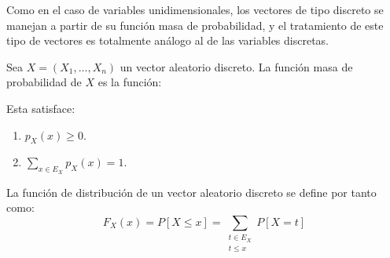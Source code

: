 Como en el caso de variables unidimensionales, los vectores de tipo discreto se manejan a partir de su función masa de probabilidad, y el tratamiento de este tipo de vectores es totalmente análogo al de las variables discretas.
\begin{definicion}
    Sea $X=(X_1, \ldots, X_n)$ un vector aleatorio discreto. La función masa de probabilidad de $X$ es la función:
\end{definicion}

Esta satisface:
\begin{enumerate}
    \item $p_X(x)\geq 0$.
    \item $\sum\limits_{x\in E_X} p_X(x) = 1$.
\end{enumerate}

La función de distribución de un vector aleatorio discreto se define por tanto como:
\begin{equation*}
    F_X(x) = P[X\leq x] = \sum_{\substack{t\in E_X\\t\leq x}} P[X=t]
\end{equation*}



